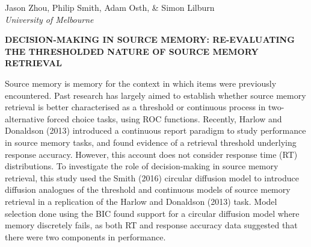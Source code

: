 \documentclass[]{article}
\begin{document}
Jason Zhou, Philip Smith, Adam Osth, \& Simon Lilburn\\
\emph{University of Melbourne}

\textbf{DECISION-MAKING IN SOURCE MEMORY: RE-EVALUATING THE THRESHOLDED
NATURE OF SOURCE MEMORY RETRIEVAL}

Source memory is memory for the context in which items were previously
encountered. Past research has largely aimed to establish whether source
memory retrieval is better characterised as a threshold or continuous
process in two-alternative forced choice tasks, using ROC functions.
Recently, Harlow and Donaldson (2013) introduced a continuous report
paradigm to study performance in source memory tasks, and found evidence
of a retrieval threshold underlying response accuracy. However, this
account does not consider response time (RT) distributions. To
investigate the role of decision-making in source memory retrieval, this
study used the Smith (2016) circular diffusion model to introduce
diffusion analogues of the threshold and continuous models of source
memory retrieval in a replication of the Harlow and Donaldson (2013)
task. Model selection done using the BIC found support for a circular
diffusion model where memory discretely fails, as both RT and response
accuracy data suggested that there were two components in performance.\\
\pagebreak
\end{document}
